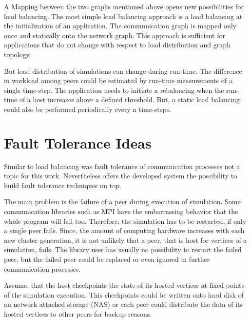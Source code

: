 \noindent A Mapping between the two graphs mentioned above opens new
possibilities for load balancing.  The most simple load balancing
approach is a load balancing at the initialization of an
application. The communication graph is mapped only once and
statically onto the network graph. This approach is sufficient for
applications that do not change with respect to load distribution
and graph topology.

But load distribution of simulations can change during run-time. The
difference in workload among peers could be estimated by run-time
measurements of a single time-step. The application needs to
initiate a rebalancing when the run-time of a host increases above a
defined threshold.  But, a static load balancing could also be
performed periodically every n time-steps.

\section*{Fault Tolerance Ideas}

Similar to load balancing was fault tolerance of communication
processes not a topic for this work. Nevertheless offers the developed
system the possibility to build fault tolerance techniques on top.

The main problem is the failure of a peer during execution of
simulation.  Some communication libraries such as MPI have the
embarrassing behavior that the whole program will fail too. Therefore,
the simulation has to be restarted, if only a single peer fails.
Since, the amount of computing hardware increases with each new
cluster generation, it is not unlikely that a peer, that is host for
vertices of a simulation, fails. The library user has usually no
possibility to restart the failed peer, but the failed peer could be
replaced or even ignored in further communication processes.

Assume, that the host checkpoints the state of its hosted
vertices at fixed points of the simulation execution. This
checkpoints could be written onto hard disk of an network attached
storage (NAS) or each peer could distribute the data of its hosted
vertices to other peers for backup reasons.

